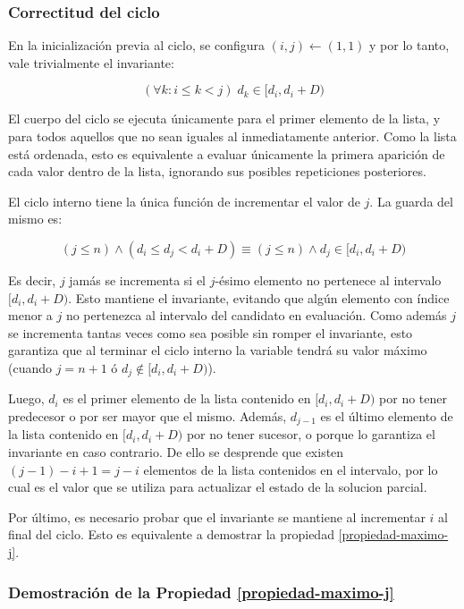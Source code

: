 \subsubsection{Correctitud del ciclo}

En la inicialización previa al ciclo, se configura $(i, j) \leftarrow (1, 1)$ y por lo tanto, vale trivialmente el invariante:

$$(\forall k: i \leq k < j)\;d_k \in [d_i, d_i + D)$$

El cuerpo del ciclo se ejecuta únicamente para el primer elemento de la lista, y para todos aquellos que no sean iguales al inmediatamente anterior. Como la lista está ordenada, esto es equivalente a evaluar únicamente la primera aparición de cada valor dentro de la lista, ignorando sus posibles repeticiones posteriores.

El ciclo interno tiene la única función de incrementar el valor de $j$. La guarda del mismo es:

$$(j \leq n) \land (d_i \leq d_j < d_i + D) \equiv (j \leq n) \land d_j \in [d_i, d_i + D)$$

Es decir, $j$ jamás se incrementa si el $j$-ésimo elemento no pertenece al intervalo $[d_i, d_i + D)$. Esto mantiene el invariante, evitando que algún elemento con índice menor a $j$ no pertenezca al intervalo del candidato en evaluación. Como además $j$ se incrementa tantas veces como sea posible sin romper el invariante, esto garantiza que al terminar el ciclo interno la variable tendrá su valor máximo (cuando $j = n + 1$ ó $d_j \notin [d_i, d_i + D)$).

Luego, $d_i$ es el primer elemento de la lista contenido en $[d_i, d_i + D)$ por no tener predecesor o por ser mayor que el mismo. Además, $d_{j-1}$ es el último elemento de la lista contenido en $[d_i, d_i + D)$ por no tener sucesor, o porque lo garantiza el invariante en caso contrario. De ello se desprende que existen $(j - 1) - i + 1 = j - i$ elementos de la lista contenidos en el intervalo, por lo cual es el valor que se utiliza para actualizar el estado de la solucion parcial.

Por último, es necesario probar que el invariante se mantiene al incrementar $i$ al final del ciclo. Esto es equivalente a demostrar la propiedad \ref{propiedad-maximo-j}.

\subsubsection{Demostración de la Propiedad \ref{propiedad-maximo-j}}

